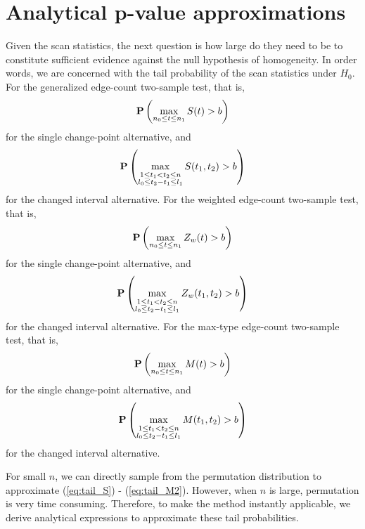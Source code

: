 \documentclass[arxiv, preprint]{imsart}
\numberwithin{equation}{section}
\theoremstyle{plain}
\begin{document}
\section{Analytical p-value approximations}
\label{sec:4}
Given the scan statistics, the next question is how large do they need to be to constitute sufficient evidence against the null hypothesis of homogeneity. In order words, we are concerned with the tail probability of the scan statistics under $H_0$. For the generalized edge-count two-sample test, that is, 
\begin{equation} 
\label{eq:tail_S}
\mathbf{P} \left(\max_{n_0 \le t \le n_1} S(t) > b \right) \end{equation}
for the single change-point alternative, and 
\begin{equation}
\label{eq:tail_S2}
\mathbf{P} \left(\max_{\substack{\\ 1 \le t_1 < t_2 \le n \\ l_0 \le t_2 - t_1 \le l_1}} S(t_1,t_2) > b \right)  \end{equation}
for the changed interval alternative. For the weighted edge-count two-sample test, that is, 
\begin{equation} 
\label{eq:tail_Rw}
\mathbf{P} \left(\max_{n_0 \le t \le n_1} Z_w(t) > b \right) 
\end{equation}
for the single change-point alternative, and 
\begin{equation}
\label{eq:tail_Rw2} 
\mathbf{P} \left(\max_{\substack{\\ 1 \le t_1 < t_2 \le n \\ l_0 \le t_2 - t_1 \le l_1}} Z_w(t_1,t_2) > b \right)  \end{equation}
for the changed interval alternative. For the max-type edge-count two-sample test, that is, 
\begin{equation} 
\label{eq:tail_M}
\mathbf{P} \left(\max_{n_0 \le t \le n_1} M(t) > b \right) 
\end{equation}
for the single change-point alternative, and 
\begin{equation}
\label{eq:tail_M2} 
\mathbf{P} \left(\max_{\substack{\\ 1 \le t_1 < t_2 \le n \\ l_0 \le t_2 - t_1 \le l_1}} M(t_1,t_2) > b \right)  \end{equation}
for the changed interval alternative. 

For small $n$, we can directly sample from the permutation distribution to approximate (\ref{eq:tail_S}) - (\ref{eq:tail_M2}). However, when $n$ is large, permutation is very time consuming. Therefore, to make the method instantly applicable, we derive analytical expressions to approximate these tail probabilities. 
\end{document}

